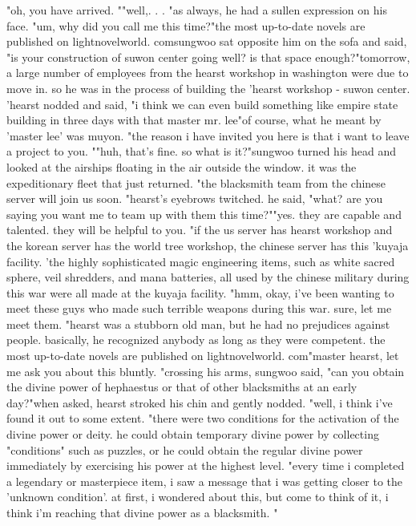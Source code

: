 "oh, you have arrived.
""well,.
.
.
"as always, he had a sullen expression on his face.
"um, why did you call me this time?"the most up-to-date novels are published on lightnov­elworld.
comsungwoo sat opposite him on the sofa and said, "is your construction of suwon center going well? is that space enough?"tomorrow, a large number of employees from the hearst workshop in washington were due to move in.
 so he was in the process of building the 'hearst workshop - suwon center.
'hearst nodded and said, "i think we can even build something like empire state building in three days with that master mr.
 lee"of course, what he meant by 'master lee' was muyon.
"the reason i have invited you here is that i want to leave a project to you.
""huh, that's fine.
 so what is it?"sungwoo turned his head and looked at the airships floating in the air outside the window.
 it was the expeditionary fleet that just returned.
"the blacksmith team from the chinese server will join us soon.
"hearst's eyebrows twitched.
he said, "what? are you saying you want me to team up with them this time?""yes.
 they are capable and talented.
 they will be helpful to you.
"if the us server has hearst workshop and the korean server has the world tree workshop, the chinese server has this 'kuyaja facility.
'the highly sophisticated magic engineering items, such as white sacred sphere, veil shredders, and mana batteries, all used by the chinese military during this war were all made at the kuyaja facility.
"hmm, okay, i've been wanting to meet these guys who made such terrible weapons during this war.
 sure, let me meet them.
"hearst was a stubborn old man, but he had no prejudices against people.
 basically, he recognized anybody as long as they were competent.
the most up-to-date novels are published on lightnovelworld.
c­om"master hearst, let me ask you about this bluntly.
"crossing his arms, sungwoo said, "can you obtain the divine power of hephaestus or that of other blacksmiths at an early day?"when asked, hearst stroked his chin and gently nodded.
"well, i think i've found it out to some extent.
"there were two conditions for the activation of the divine power or deity.
 he could obtain temporary divine power by collecting "conditions" such as puzzles, or he could obtain the regular divine power immediately by exercising his power at the highest level.
 "every time i completed a legendary or masterpiece item, i saw a message that i was getting closer to the 'unknown condition'.
 at first, i wondered about this, but come to think of it, i think i'm reaching that divine power as a blacksmith.
"

